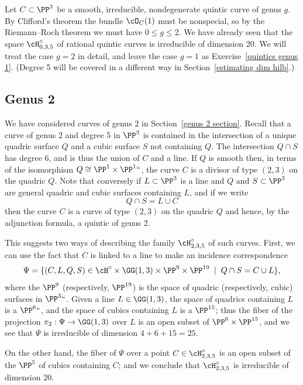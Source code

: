 Let $C \subset \PP^3$ be a smooth, irreducible, nondegenerate quintic
curve of genus $g$. By Clifford's theorem the bundle $\cO_C(1)$ must
be nonspecial, so  by the Riemann--Roch theorem we must have $0\leq
g \leq 2$. We have already seen that the space $\cH^\circ_{0,3,5}$
%
of rational quintic curves is irreducible of dimension 20. We
will treat the case $g=2$ in detail, and leave the case $g=1$ as
Exercise~\ref{quintics genus 1}. (Degree 5 will be covered in a different
way in Section~\ref{estimating dim hilb}.)

\subsection*{Genus 2}

We have considered curves of genus 2 in Section~\ref{genus 2 section}.
Recall that a curve of genus 2 and degree 5 in
$\PP^3$ is contained in the intersection of a unique quadric surface $Q$
and a cubic surface $S$ not containing $Q$.
The intersection $Q\cap S$
has degree 6, and is thus the union of $C$ and a line. If $Q$ is smooth
then, in terms of the isomorphism $Q \cong \PP^1 \times \PP^1` `$, the
curve $C$ is a divisor of type $(2,3)$ on the quadric $Q$. Note that
conversely if $L \subset \PP^3$ is a line and $Q$ and $S \subset \PP^3$
are general quadric and cubic surfaces containing $L$, and if we write
$$
Q \cap S = L \cup C
$$
then the curve $C$ is a curve of type $(2,3)$ on the quadric $Q$ and
hence, by the adjunction formula,
 a quintic of genus 2.

This suggests two ways of describing the family $\cH^\circ_{2,3,5}$ of
%
such curves. First, we can use the fact that $C$ is linked to a line to
make an incidence correspondence
$$
\Psi = \{ (C, L, Q, S) \in \cH^\circ \times \GG(1,3) \times \PP^9 \times
\PP^{19} \; \mid \; Q \cap S = C \cup L \},
$$
where the $\PP^9$ (respectively, $\PP^{19}$) is the space of quadric
(respectively, cubic) surfaces in $\PP^3` `$. Given a line $L \in \GG(1,3)$,
the space of quadrics containing $L$ is a $\PP^6` `$, and the space of cubics
containing $L$ is a $\PP^{15}$; thus the fiber of the projection $\pi_2 :
\Psi \to \GG(1,3)$ over $L$ is an open subset of $\PP^6 \times \PP^{15}$,
and we see that $\Psi$ is irreducible of dimension $4 + 6 + 15 = 25$.

On the other hand, the fiber of $\Psi$ over a point $C \in
\cH^\circ_{2,3,5}$ is an open subset of the $\PP^5$ of cubics containing
$C$; and we conclude that $\cH^\circ_{2,3,5}$ is irreducible of dimension
$20$.


